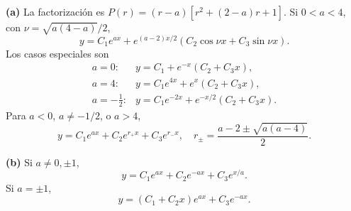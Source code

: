 \noindent\textbf{(a)} La factorización es \(P(r)=(r-a)[r^2+(2-a)r+1]\). Si \(0<a<4\), con \(\nu=\sqrt{a(4-a)}/2\),
\[y=C_1e^{ax}+e^{(a-2)x/2}(C_2\cos\nu x+C_3\sin\nu x).\]
Los casos especiales son
\[\begin{array}{ll}a=0:&y=C_1+e^{-x}(C_2+C_3x),\\a=4:&y=C_1e^{4x}+e^x(C_2+C_3x),\\a=-\tfrac12:&y=C_1e^{-2x}+e^{-x/2}(C_2+C_3x).\end{array}\]
Para \(a<0\), \(a\ne-1/2\), o \(a>4\),
\[y=C_1e^{ax}+C_2e^{r_+x}+C_3e^{r_-x},\quad r_\pm=\frac{a-2\pm\sqrt{a(a-4)}}2.\]

\noindent\textbf{(b)} Si \(a\ne0,\pm1\),
\[y=C_1e^{ax}+C_2e^{-ax}+C_3e^{x/a}.\]
Si \(a=\pm1\),
\[y=(C_1+C_2x)e^{ax}+C_3e^{-ax}.\]
